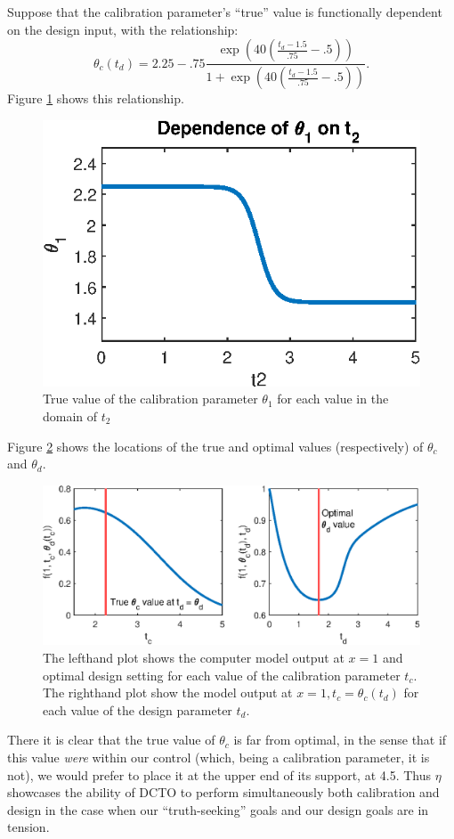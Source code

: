\documentclass[12pt]{article}
\begin{document}
%
Suppose that the calibration parameter's ``true'' value is functionally dependent on the design input, with the relationship:
%
\[\theta_c(t_d)= 2.25 - .75 \frac{ \exp\left(40\left(\frac{t_d-1.5}{.75}-.5\right)\right)} {1 + \exp\left( 40\left(\frac{t_d-1.5}{.75}-.5\right) \right)}.\]
%
Figure \ref{fig:SA_relationship} shows this relationship.
%
\begin{figure}
	\centering
	\includegraphics[scale=0.85]{FIG_theta_1_dependence_on_t2}
	\captionsetup{width=.85\linewidth}
	\caption{True value of the calibration parameter $\theta_1$ for each value in the domain of $t_2$}
	\label{fig:SA_relationship}
\end{figure}
%
Figure \ref{fig:true_vals} shows the locations of the true and optimal values (respectively) of $\theta_c$ and $\theta_d$.
%
\begin{figure}
	\centering
	\includegraphics[scale=0.85]{FIG_true_optimal_theta1_theta2.eps}
	\captionsetup{width=.85\linewidth}
	\caption{The lefthand plot shows the computer model output at $x=1$ and optimal design setting for each value of the calibration parameter $t_c$. The righthand plot show the model output at $x=1,t_c=\theta_c(t_d)$ for each value of the design parameter $t_d$.}
	\label{fig:true_vals}
\end{figure}
%
There it is clear that the true value of $\theta_c$ is far from optimal, in the sense that if this value \textit{were} within our control (which, being a calibration parameter, it is not), we would prefer to place it at the upper end of its support, at 4.5.
%
Thus $\eta$ showcases the ability of DCTO to perform simultaneously both calibration and design in the case when our ``truth-seeking'' goals and our design goals are in tension.
%
\end{document}
